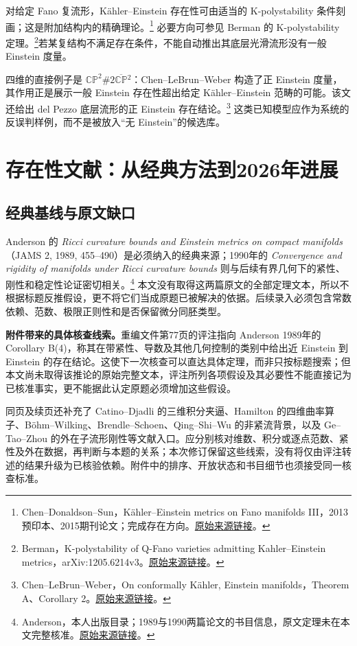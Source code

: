 \documentclass[11pt,a4paper]{article}
\theoremstyle{definition}
\newcommand{\src}[3]{\footnote{\raggedright #1，#2。\href{#3}{原始来源链接}。}}
\begin{document}
对给定 Fano 复流形，Kähler--Einstein 存在性可由适当的 K-polystability 条件刻画；这是附加结构内的精确理论。\src{Chen--Donaldson--Sun}{Kähler--Einstein metrics on Fano manifolds III，2013预印本、2015期刊论文；完成存在方向}{https://arxiv.org/abs/1302.0282}
必要方向可参见 Berman 的 K-polystability 定理。\src{Berman}{K-polystability of Q-Fano varieties admitting Kahler--Einstein metrics，arXiv:1205.6214v3}{https://arxiv.org/abs/1205.6214v3}若某复结构不满足存在条件，不能自动推出其底层光滑流形没有一般 Einstein 度量。

四维的直接例子是 $\mathbb{CP}^2\#2\overline{\mathbb{CP}}{}^2$：Chen--LeBrun--Weber 构造了正 Einstein 度量，其作用正是展示一般 Einstein 存在性超出给定 Kähler--Einstein 范畴的可能。该文还给出 del Pezzo 底层流形的正 Einstein 存在结论。\src{Chen--LeBrun--Weber}{On conformally Kähler, Einstein manifolds，Theorem A、Corollary 2}{https://arxiv.org/abs/0705.0710}
这类已知模型应作为系统的反误判样例，而不是被放入“无 Einstein”的候选库。

\section{存在性文献：从经典方法到2026年进展}\label{sec:existence}

\subsection{经典基线与原文缺口}

Anderson 的 \emph{Ricci curvature bounds and Einstein metrics on compact manifolds}（JAMS 2, 1989, 455--490）是必须纳入的经典来源；1990年的 \emph{Convergence and rigidity of manifolds under Ricci curvature bounds} 则与后续有界几何下的紧性、刚性和稳定性论证密切相关。\src{Anderson}{本人出版目录；1989与1990两篇论文的书目信息，原文定理未在本文完整核准}{https://www.math.stonybrook.edu/~anderson/publ.pdf}
本文没有取得这两篇原文的全部定理文本，所以不根据标题反推假设，更不将它们当成原题已被解决的依据。后续录入必须包含常数依赖、范数、极限正则性和是否保留微分同胚类型。

\textbf{附件带来的具体核查线索。}重编文件第77页的评注指向 Anderson 1989年的 Corollary B(4)，称其在带紧性、导数及其他几何控制的类别中给出近 Einstein 到 Einstein 的存在结论。这使下一次核查可以直达具体定理，而非只按标题搜索；但本文尚未取得该推论的原始完整文本，评注所列各项假设及其必要性不能直接记为已核准事实，更不能据此认定原题必须增加这些假设。

同页及续页还补充了 Catino--Djadli 的三维积分夹逼、Hamilton 的四维曲率算子、Böhm--Wilking、Brendle--Schoen、Qing--Shi--Wu 的非紧流背景，以及 Ge--Tao--Zhou 的外在子流形刚性等文献入口。应分别核对维数、积分或逐点范数、紧性及外在数据，再判断与本题的关系；本次修订保留这些线索，没有将仅由评注转述的结果升级为已核验依赖。附件中的排序、开放状态和书目细节也须接受同一核查标准。
\end{document}
